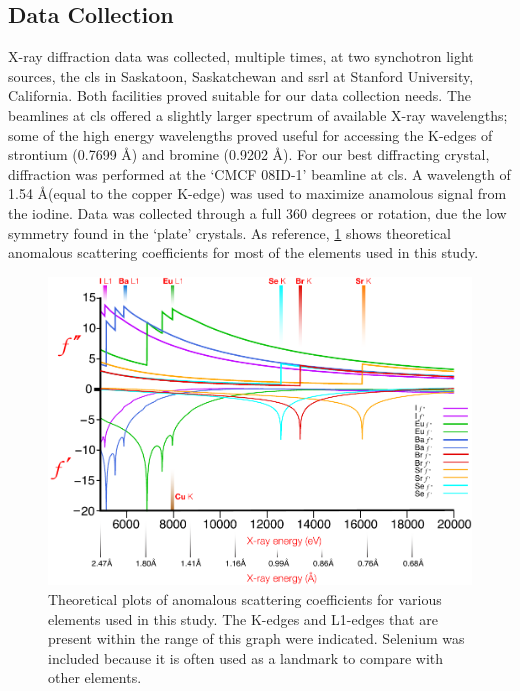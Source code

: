 \subsection{Data Collection}\label{sec:crystal-data-collection}
X-ray diffraction data was collected, multiple times, at two synchotron light sources, the \ac{cls} in Saskatoon, Saskatchewan and \ac{ssrl} at Stanford University, California. Both facilities proved suitable for our data collection needs. The beamlines at \ac{cls} offered a slightly larger spectrum of available X-ray wavelengths; some of the high energy wavelengths proved useful for accessing the K-edges of strontium (0.7699 \AA) and bromine (0.9202 \AA). For our best diffracting crystal, diffraction was performed at the `CMCF 08ID-1' beamline at \ac{cls}. A wavelength of 1.54 \AA (equal to the copper K-edge) was used to maximize anamolous signal from the iodine. Data was collected through a full 360 degrees or rotation, due the low symmetry found in the `plate' crystals. As reference, \cref{fig:edges} shows theoretical anomalous scattering coefficients for most of the elements used in this study.

\begin{figure}[htb]
  	\begin{center}
   		\includegraphics[width=\textwidth]{crystal_chapter/img/edgeplots.pdf}
   	\end{center}
   	\caption[Edge plots for useful anomalous dispersion elements]{
   	Theoretical plots of anomalous scattering coefficients for various elements used in this study. The K-edges and L1-edges that are present within the range of this graph were indicated. Selenium was included because it is often used as a landmark to compare with other elements.}
   	\label{fig:edges}
\end{figure}    

